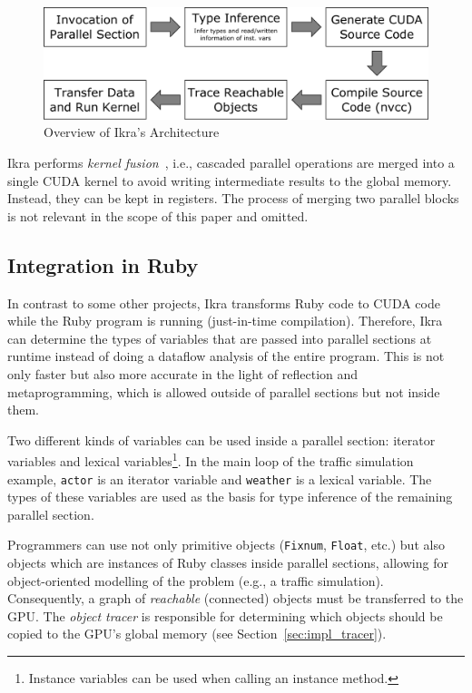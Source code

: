 \documentclass[preprint]{sigplanconf}
\begin{document}
\begin{figure}[!tp]
    \includegraphics[width=\columnwidth]{high_level_arch.pdf}
    \caption{Overview of Ikra's Architecture}
    \label{fig:overview_arch}
\end{figure}

Ikra performs \emph{kernel fusion}~\cite{Wu:2012:KWA:2457472.2457490, Wahib:2014:SKF:2683593.2683615}, i.e., cascaded parallel operations are merged into a single CUDA kernel to avoid writing intermediate results to the global memory. Instead, they can be kept in registers. The process of merging two parallel blocks is not relevant in the scope of this paper and omitted.

\subsection{Integration in Ruby}
In contrast to some other projects, Ikra transforms Ruby code to CUDA code while the Ruby program is running (just-in-time compilation). Therefore, Ikra can determine the types of variables that are passed into parallel sections at runtime instead of doing a dataflow analysis of the entire program. This is not only faster but also more accurate in the light of reflection and metaprogramming, which is allowed outside of parallel sections but not inside them.

Two different kinds of variables can be used inside a parallel section: iterator variables and lexical variables\footnote{Instance variables can be used when calling an instance method.}. In the main loop of the traffic simulation example, \texttt{actor} is an iterator variable and \texttt{weather} is a lexical variable. The types of these variables are used as the basis for type inference of the remaining parallel section.

Programmers can use not only primitive objects (\texttt{Fixnum}, \texttt{Float}, etc.) but also objects which are instances of Ruby classes inside parallel sections, allowing for object-oriented modelling of the problem (e.g., a traffic simulation). Consequently, a graph of \emph{reachable} (connected) objects must be transferred to the GPU. The \emph{object tracer} is responsible for determining which objects should be copied to the GPU's global memory (see Section~\ref{sec:impl_tracer}).
\end{document}
